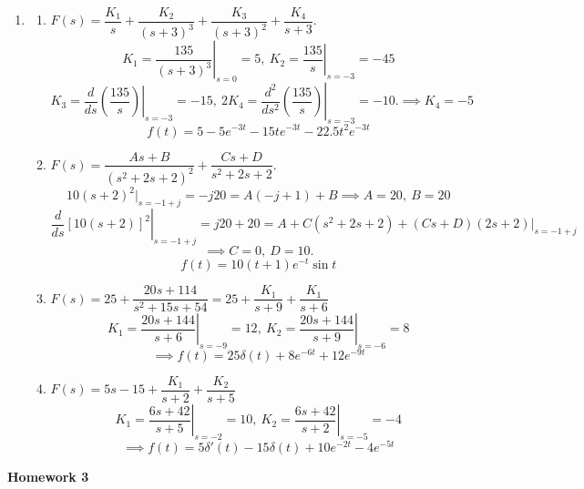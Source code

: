 \documentclass[11pt]{article}
\begin{document}
\begin{enumerate}[leftmargin=*,label=\textbf{2.\arabic*.}]
\begin{enumerate}[label=\textbf{\alph*)}]
\end{enumerate}.


\item \begin{enumerate}[label=\textbf{\alph*)}]

\item $F(s)=\dfrac{K_1}s+\dfrac{K_2}{(s+3)^3}+\dfrac{K_3}{(s+3)^2}+\dfrac{K_4}{s+3}$.
\[K_1=\left.\dfrac{135}{(s+3)^3}\right|_{s=0}=5,\:K_2=\left.\dfrac{135}{s}\right|_{s=-3}=-45\]
\[K_3=\left.\frac d{ds}\left(\dfrac{135}{s}\right)\right|_{s=-3}=-15,\:2K_4=\left.\frac{d^2}{ds^2}\left(\dfrac{135}{s}\right)\right|_{s=-3}=-10.\implies K_4=-5\]
\[\boxed{f(t)=5-5e^{-3t}-15te^{-3t}-22.5t^2e^{-3t}}\]
\item $F(s)=\dfrac{As+B}{(s^2+2s+2)^2}+\dfrac{Cs+D}{s^2+2s+2}$.
\[10(s+2)^2|_{s=-1+j}=-j20=A(-j+1)+B\implies A=20,\: B=20\]
\[\left.\frac{d}{ds}[10(s+2)]^2\right|_{s=-1+j}=j20+20=A+C(s^2+2s+2)+(Cs+D)(2s+2)|_{s=-1+j}\]
\[\implies C=0,\: D=10.\]
\[\boxed{f(t)=10(t+1)e^{-t}\sin t}\]

\item $F(s)=25+\dfrac{20s+114}{s^2+15s+54}=25+\dfrac{K_1}{s+9}+\dfrac{K_1}{s+6}$
\[K_1=\left.\dfrac{20s+144}{s+6}\right|_{s=-9}=12,\:K_2=\left.\dfrac{20s+144}{s+9}\right|_{s=-6}=8\]
\[\implies\boxed{f(t)=25\delta(t)+8e^{-6t}+12e^{-9t}}\]

\item $F(s)=5s-15+\dfrac{K_1}{s+2}+\dfrac{K_2}{s+5}$
\[K_1=\left.\dfrac{6s+42}{s+5}\right|_{s=-2}=10,\:K_2=\left.\dfrac{6s+42}{s+2}\right|_{s=-5}=-4\]
\[\implies\boxed{f(t)=5\delta'(t)-15\delta(t)+10e^{-2t}-4e^{-5t}}\]

\end{enumerate}

\end{enumerate}

\textbf{Homework 3}
\end{document}
